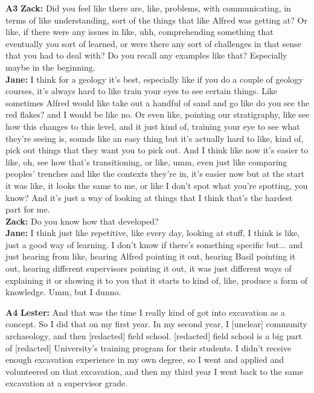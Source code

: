 \documentclass{article}
\begin{document}
\noindent\textbf{A3}\label{sec-A3}\newline
\textbf{Zack:} Did you feel like there are, like, problems, with
communicating, in terms of like understanding, sort of the things that
like Alfred was getting at? Or like, if there were any issues in like,
uhh, comprehending something that eventually you sort of learned, or
were there any sort of challenges in that sense that you had to deal
with? Do you recall any examples like that? Especially maybe in the
beginning.\\
\textbf{Jane:} I think for a geology it's best, especially like if you
do a couple of geology courses, it's always hard to like train your eyes
to see certain things. Like sometimes Alfred would like take out a
handful of sand and go like do you see the red flakes? and I would be
like no. Or even like, pointing our stratigraphy, like see how this
changes to this level, and it just kind of, training your eye to see
what they're seeing is, sounds like an easy thing but it's actually hard
to like, kind of, pick out things that they want you to pick out. And I
think like now it's easier to like, oh, see how that's transitioning, or
like, umm, even just like comparing peoples' trenches and like the
contexts they're in, it's easier now but at the start it was like, it
looks the same to me, or like I don't spot what you're spotting, you
know? And it's just a way of looking at things that I think that's the
hardest part for me.\\
\textbf{Zack:} Do you know how that developed?\\
\textbf{Jane:} I think just like repetitive, like every day, looking at
stuff, I think is like, just a good way of learning. I don't know if
there's something specific but... and just hearing from like, hearing
Alfred pointing it out, hearing Basil pointing it out, hearing different
supervisors pointing it out, it was just different ways of explaining it
or showing it to you that it starts to kind of, like, produce a form of
knowledge. Umm, but I dunno.\newline

\noindent\textbf{A4}\label{sec-A4}\newline
\textbf{Lester:} And that was the time I really kind of got into
excavation as a concept. So I did that on my first year. In my second
year, I {[}unclear{]} community archaeology, and then {[}redacted{]}
field school. {[}redacted{]} field school is a big part of
{[}redacted{]} University's training program for their students. I
didn't receive enough excavation experience in my own degree, so I went
and applied and volunteered on that excavation, and then my third year I
went back to the same excavation at a supervisor grade.\newline
\end{document}
